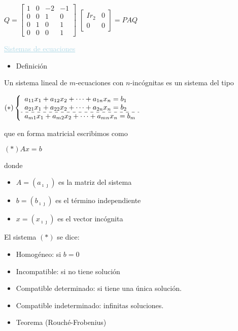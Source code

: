 \documentclass[12pt]{article}
\begin{document}
$Q=\begin{bmatrix}
1 & 0 & -2 & -1 \\ 
0 & 0 & 1 & 0 \\ 
0 & 1 & 0 & 1 \\ 
0 & 0 & 0 & 1
\end{bmatrix} $\hspace{2cm} $\left[\begin{array}{c|c}
Ir_2 & 0 \\ \hline
0 & 0
\end{array} \right]=PAQ$

\textcolor{lightblue}{\underline{Sistemas de ecuaciones}}
\begin{itemize}[label=\color{red}\textbullet, leftmargin=*]
    \item \color{lightblue} Definición
\end{itemize}
Un sistema lineal de $m$-ecuaciones con $n$-incógnitas es un
sistema del tipo

$(*)\left\lbrace
\begin{array}{l}
a_{11}x_1+a_{12}x_2+\cdots+a_{1n}x_n=b_1\\
a_{21}x_1+a_{22}x_2+\cdots+a_{2n}x_n=b_2\\
\hdashline
a_{m1}x_1+a_{m2}x_2+\cdots+a_{mn}x_n=b_m\\
\end{array}
\right.$

que en forma matricial escribimos como 

$(*)$\hspace{1cm}$Ax=b$

donde 
\begin{itemize}
\item $A=(a_{\imath\jmath  })$ es la matriz del sistema
\item $b=(b_{\imath\jmath  })$ es el término independiente
\item $x=(x_{\imath\jmath  })$ es el vector incógnita
\end{itemize}
El sistema $(*)$ se dice:
\begin{itemize}
\item Homogéneo: si $b=0$
\item Incompatible: si no tiene solución
\item Compatible determinado: si tiene una única solución.
\item Compatible indeterminado: infinitas soluciones.
\end{itemize}
\begin{itemize}[label=\color{red}\textbullet, leftmargin=*]
    \item \color{lightblue}Teorema (Rouché-Frobenius)
\end{itemize}
\end{document}
